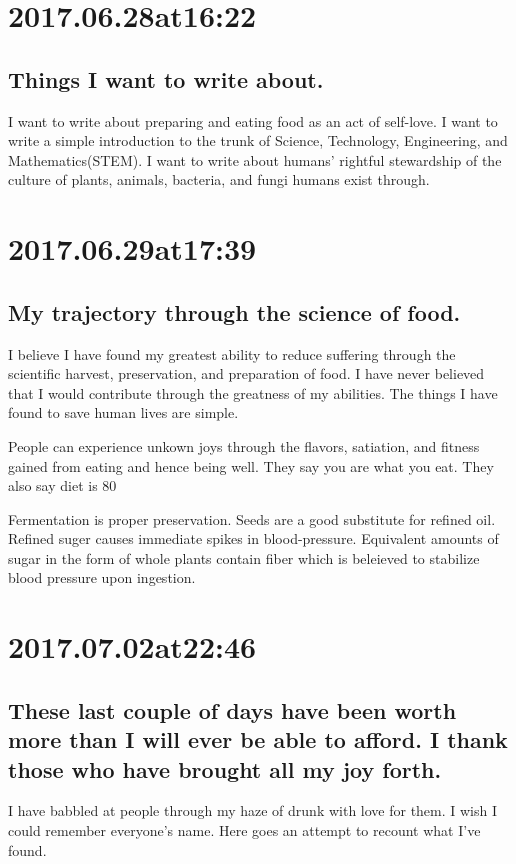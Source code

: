 \section*{ 2017.06.28at16:22 }
\subsection*{ Things I want to write about. }
I want to write about preparing and eating food as an act of self-love. I want to write a simple introduction to the trunk of Science, Technology, Engineering, and Mathematics(STEM). I want to write about humans' rightful stewardship of the culture of plants, animals, bacteria, and fungi humans exist through.

\section*{ 2017.06.29at17:39 }
\subsection*{ My trajectory through the science of food. }
I believe I have found my greatest ability to reduce suffering through the scientific harvest, preservation, and preparation of food. I have never believed that I would contribute through the greatness of my abilities. The things I have found to save human lives are simple.

People can experience unkown joys through the flavors, satiation, and fitness gained from eating and hence being well. They say you are what you eat. They also say diet is 80%

Fermentation is proper preservation. Seeds are a good substitute for refined oil. Refined suger causes immediate spikes in blood-pressure. Equivalent amounts of sugar in the form of whole plants contain fiber which is beleieved to stabilize blood pressure upon ingestion.

\section*{ 2017.07.02at22:46 }
\subsection*{ These last couple of days have been worth more than I will ever be able to afford. I thank those who have brought all my joy forth. }
I have babbled at people through my haze of drunk with love for them. I wish I could remember everyone's name. Here goes an attempt to recount what I've found.


